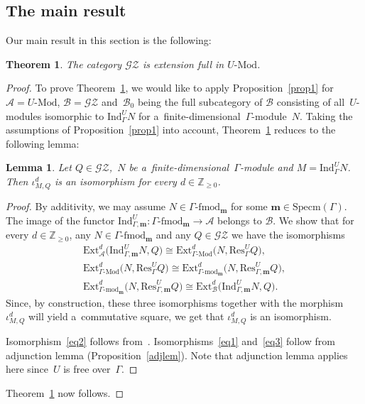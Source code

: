 \documentclass[11pt]{article}
\newtheorem{theorem}{Theorem}
\newtheorem{lemma}{Lemma}
\newcommand{\dash}[1]{\text{-}\mathrm{#1}}
\begin{document}
\subsection{The main result}%

Our main result in this section is the following:

\begin{theorem}
\label{thm3}
The category $\mathscr{G}\mathscr{Z}$ is extension full in $U\dash{Mod}$.
\end{theorem}

\begin{proof}
To prove Theorem~\ref{thm3}, we would like to apply Proposition~\ref{prop1} for $\mathcal{A}=U\dash{Mod}$,
$\mathcal{B}=\mathscr{G}\mathscr{Z}$ and~$\mathcal{B}_0$ being the full subcategory of $\mathcal{B}$ consisting of
all~$U$-modules isomorphic to $\mathrm{Ind}_{\Gamma}^U N$ for a~f\/inite-dimensional~$\Gamma$-module~$N$.
Taking the assumptions of Proposition~\ref{prop1} into account, Theorem~\ref{thm3} reduces to the following lemma:

\begin{lemma}
Let $Q\in\mathscr{G}\mathscr{Z}$,~$N$ be a~finite-dimensional~$\Gamma$-module and $M=\mathrm{Ind}_{\Gamma}^U N$.
Then $\iota^d_{M,Q}$ is an isomorphism for every $d\in\mathbb{Z}_{\geq 0}$.
\end{lemma}

\begin{proof}
By additivity, we may assume $N\in \Gamma\dash{fmod}_{\mathbf{m}}$ for some $\mathbf{m}\in\mathrm{Specm}(\Gamma)$.
The image of the functor $\mathrm{Ind}_{\Gamma,\mathbf{m}}^U:\Gamma\dash{fmod}_{\mathbf{m}}\to \mathcal{A}$ belongs to
$\mathcal{B}$.
We show that for every $d\in\mathbb{Z}_{\geq 0}$, any $N\in \Gamma\dash{fmod}_{\mathbf{m}}$ and any
$Q\in\mathscr{G}\mathscr{Z}$ we have the isomorphisms
\begin{gather}
\label{eq1}
\mathrm{Ext}^d_{\mathcal{A}}\big(\mathrm{Ind}_{\Gamma,\mathbf{m}}^U N, Q\big)  \cong
\mathrm{Ext}^d_{\Gamma\dash{Mod}}\big(N,\mathrm{Res}_{\Gamma}^U Q\big),
\\
\label{eq2}
\mathrm{Ext}^d_{\Gamma\dash{Mod}}\big(N,\mathrm{Res}_{\Gamma}^U Q\big)  \cong
\mathrm{Ext}^d_{\Gamma\dash{mod}_{\mathbf{m}}}\big(N,\mathrm{Res}_{\Gamma,\mathbf{m}}^U Q\big),
\\
\label{eq3}
\mathrm{Ext}^d_{\Gamma\dash{mod}_{\mathbf{m}}}\big(N,\mathrm{Res}_{\Gamma,\mathbf{m}}^U Q\big)  \cong
\mathrm{Ext}^d_{\mathcal{B}}\big(\mathrm{Ind}_{\Gamma,\mathbf{m}}^U N, Q\big).
\end{gather}
Since, by construction, these three isomorphisms together with the morphism $\iota^d_{M,Q}$ will yield a~commutative
square, we get that $\iota^d_{M,Q}$ is an isomorphism.

Isomorphism~\eqref{eq2} follows from~\cite[Lemma~17]{CoMa}.
Isomorphisms~\eqref{eq1} and~\eqref{eq3} follow from adjunction lemma (Proposition~\ref{adjlem}).
Note that adjunction lemma applies here since~$U$ is free over~$\Gamma$.
\end{proof}

Theorem~\ref{thm3} now follows.
\end{proof}
\end{document}
